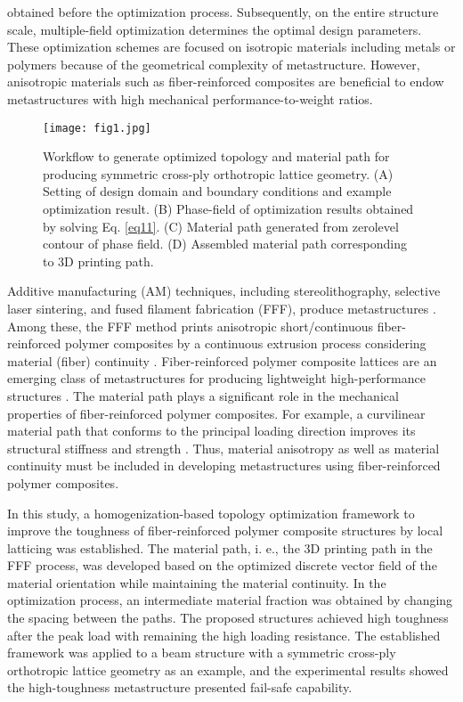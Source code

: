 \documentclass[a4paper,7pt,fleqn]{article}   %
\begin{document}
\begin{multicols}{2}
		obtained before the optimization process. Subsequently, on the entire
		structure scale, multiple-field optimization determines the optimal
		design parameters. These optimization schemes are focused on isotropic
		materials including metals or polymers because of the geometrical
		complexity of metastructure. However, anisotropic materials such as
		fiber-reinforced composites are beneficial to endow metastructures with
		high mechanical performance-to-weight ratios.\par     %
		\begin{figure*}[b!]
			\centering
			\texttt{[image: fig1.jpg]}
			\caption{\small Workflow to generate optimized topology and material path for producing symmetric cross-ply orthotropic lattice geometry. (A) Setting of design domain and boundary conditions and example optimization result. (B) Phase-field of optimization results obtained by solving Eq. \eqref{eq11}. (C) Material path generated from zerolevel contour of phase field. (D) Assembled material path corresponding to 3D printing path.}
			\label{fig1}
		\end{figure*}
		Additive manufacturing (AM) techniques, including stereolithography,
		selective laser sintering, and fused filament fabrication
		(FFF), produce metastructures \cite{r05,r14}. Among these, the FFF method
		prints anisotropic short/continuous fiber-reinforced polymer composites
		by a continuous extrusion process considering material (fiber)
		continuity \cite{r15,r16}. Fiber-reinforced polymer composite lattices are an
		emerging class of metastructures for producing lightweight
		high-performance structures \cite{r17,r18}. The material path plays a significant
		role in the mechanical properties of fiber-reinforced polymer
		composites. For example, a curvilinear material path that conforms to
		the principal loading direction improves its structural stiffness and
		strength \cite{r19,r20,r21}. Thus, material anisotropy as well as material
		continuity must be included in developing metastructures using
		fiber-reinforced polymer composites.\par    %
		In this study, a homogenization-based topology optimization
		framework to improve the toughness of fiber-reinforced polymer composite
		structures by local latticing was established. The material path, i.
		e., the 3D printing path in the FFF process, was developed based on the
		optimized discrete vector field of the material orientation while maintaining
		the material continuity. In the optimization process, an intermediate
		material fraction was obtained by changing the spacing
		between the paths. The proposed structures achieved high toughness
		after the peak load with remaining the high loading resistance. The
		established framework was applied to a beam structure with a symmetric
		cross-ply orthotropic lattice geometry as an example, and the
		experimental results showed the high-toughness metastructure presented
		fail-safe capability.
		

\end{multicols}
\end{document}
